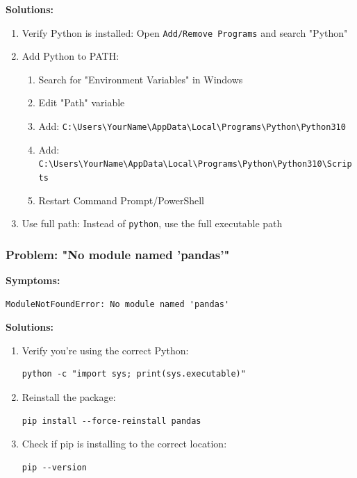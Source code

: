 \documentclass[11pt,a4paper]{article}
\begin{document}
\textbf{Solutions:}
\begin{enumerate}[leftmargin=*]
    \item Verify Python is installed: Open \texttt{Add/Remove Programs} and search "Python"
    \item Add Python to PATH:
    \begin{enumerate}
        \item Search for "Environment Variables" in Windows
        \item Edit "Path" variable
        \item Add: \texttt{C:\textbackslash Users\textbackslash YourName\textbackslash AppData\textbackslash Local\textbackslash Programs\textbackslash Python\textbackslash Python310}
        \item Add: \texttt{C:\textbackslash Users\textbackslash YourName\textbackslash AppData\textbackslash Local\textbackslash Programs\textbackslash Python\textbackslash Python310\textbackslash Scripts}
        \item Restart Command Prompt/PowerShell
    \end{enumerate}
    \item Use full path: Instead of \texttt{python}, use the full executable path
\end{enumerate}

\subsubsection{Problem: "No module named 'pandas'"}

\textbf{Symptoms:}
\begin{lstlisting}[style=shellstyle]
ModuleNotFoundError: No module named 'pandas'
\end{lstlisting}

\textbf{Solutions:}
\begin{enumerate}[leftmargin=*]
    \item Verify you're using the correct Python:
    \begin{lstlisting}[style=shellstyle]
python -c "import sys; print(sys.executable)"
    \end{lstlisting}
    \item Reinstall the package:
    \begin{lstlisting}[style=shellstyle]
pip install --force-reinstall pandas
    \end{lstlisting}
    \item Check if pip is installing to the correct location:
    \begin{lstlisting}[style=shellstyle]
pip --version
    \end{lstlisting}
\end{enumerate}
\end{document}
